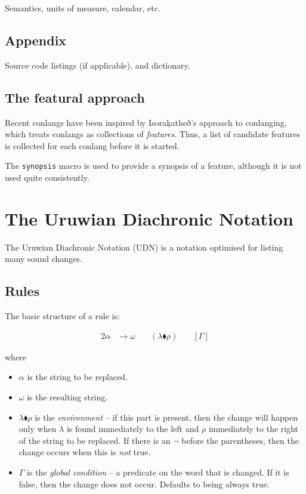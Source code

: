 \documentclass{book}
\begin{document}
Semantics, units of measure, calendar, etc.

\section{Appendix}

Source code listings (if applicable), and dictionary.

\section{The featural approach}

Recent conlangs have been inspired by Isoraķatheð's approach to conlanging, which treats conlangs as collections of \emph{features}. Thus, a list of candidate features is collected for each conlang before it is started.

The \texttt{\bs{}synopsis} macro is used to provide a synopsis of a feature, although it is not used quite consistently.

\chapter{The Uruwian Diachronic Notation}
\label{chapter:udn}

The Uruwian Diachronic Notation (UDN) is a notation optimised for listing many sound changes.

\section{Rules}

The basic structure of a rule is:

\begin{alignat}{2}
  \alpha &\rightarrow \omega &\quad(\lambda \blacklozenge \rho) &\quad[\Gamma]
\end{alignat}

where

\begin{itemize}
  \item $\alpha$ is the string to be replaced.
  \item $\omega$ is the resulting string.
  \item $\lambda \blacklozenge \rho$ is the \emph{environment} -- if this part is present, then the change will happen only when $\lambda$ is found immediately to the left and $\rho$ immediately to the right of the string to be replaced. If there is an $\lnot$ before the parentheses, then the change occurs when this is \emph{not} true.
  \item $\Gamma$ is the \emph{global condition} -- a predicate on the word that is changed. If it is false, then the change does not occur. Defaults to being always true.
\end{itemize}
\end{document}
